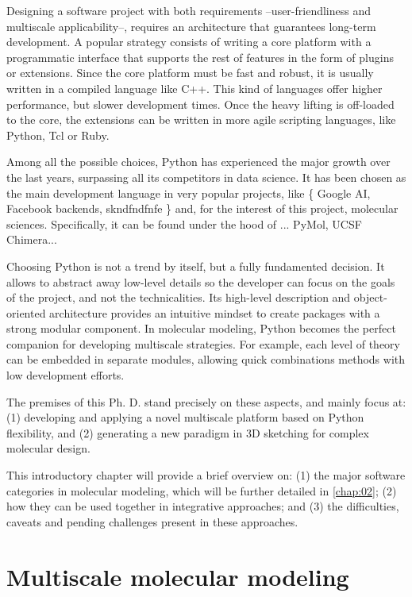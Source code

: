 Designing a software project with both requirements --user-friendliness and multiscale applicability--, requires an architecture that guarantees long-term development. A popular strategy consists of writing a core platform with a programmatic interface that supports the rest of features in the form of plugins or extensions. Since the core platform must be fast and robust, it is usually written in a compiled language like C++. This kind of languages offer higher performance, but slower development times. Once the heavy lifting is off-loaded to the core, the extensions can be written in more agile scripting languages, like Python, Tcl or Ruby.

Among all the possible choices, Python has experienced the major growth over the last years, surpassing all its competitors in data science. It has been chosen as the main development language in very popular projects, like \{ Google AI, Facebook backends, skndfndfnfe \} and, for the interest of this project, molecular sciences. Specifically, it can be found under the hood of ... PyMol, UCSF Chimera...

Choosing Python is not a trend by itself, but a fully fundamented decision. It allows to abstract away low-level details so the developer can focus on the goals of the project, and not the technicalities. Its high-level description and object-oriented architecture provides an intuitive mindset to create packages with a strong modular component. In molecular modeling, Python becomes the perfect companion for developing multiscale strategies. For example, each level of theory can be embedded in separate modules, allowing quick combinations methods with low development efforts.

The premises of this Ph. D. stand precisely on these aspects, and mainly focus at: (1) developing and applying a novel multiscale platform based on Python flexibility, and (2) generating a new paradigm in 3D sketching for complex molecular design.

This introductory chapter will provide a brief overview on: (1) the major software categories in molecular modeling, which will be further detailed in \autoref{chap:02}; (2) how they can be used together in integrative approaches; and (3) the difficulties, caveats and pending challenges present in these approaches.

\section{Multiscale molecular modeling}

